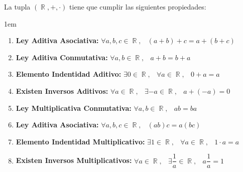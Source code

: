 \documentclass[12pt, fleqn]{report}                             %
\newenvironment{SmallIndentation}[1][0.75em]                    %
        {\begin{adjustwidth}{#1}{}\begin{footnotesize}}             %
        {\end{footnotesize}\end{adjustwidth}}                       %
\DeclareMathOperator \Space     {\quad}                         %
\DeclareMathOperator \MiniSpace {\;}                            %
\theoremstyle{break}                                            %
\DeclareMathOperator \Reals        {\mathbb{R}}                 %
\begin{document}
                La tupla $(\Reals, +, \cdot)$ tiene que cumplir las siguientes
                propiedades:

                \begin{SmallIndentation}[1em]

                    \begin{enumerate}
                    
                        \item 
                            \textbf{Ley Aditiva Asociativa:}
                            $\forall a, b, c \in \Reals, \MiniSpace
                                (a + b) + c = a + (b + c)$

                        \item 
                            \textbf{Ley Aditiva Conmutativa:}
                            $\forall a, b \in \Reals, \MiniSpace
                                    a + b = b + a$

                        \item 
                            \textbf{Elemento Indentidad Aditivo:}
                            $\exists 0 \in \Reals, \MiniSpace
                                \forall a \in \Reals, \MiniSpace 0 + a = a$

                        \item 
                            \textbf{Existen Inversos Aditivos:}
                            $\forall a \in \Reals, \MiniSpace
                                    \exists -a \in \Reals, \MiniSpace
                                        a + (-a) = 0$

                        \item 
                            \textbf{Ley Multiplicativa Conmutativa:}
                            $\forall a, b \in \Reals, \MiniSpace
                                    ab = ba$

                        \item 
                            \textbf{Ley Aditiva Asociativa:}
                            $\forall a, b, c \in \Reals, \MiniSpace
                                (ab)c = a(bc)$

                        \item 
                            \textbf{Elemento Indentidad Multiplicativo:}
                            $\exists 1 \in \Reals, \MiniSpace
                                \forall a \in \Reals, \MiniSpace 1 \cdot a = a$

                        \item 
                            \textbf{Existen Inversos Multiplicativos:}
                            $\forall a \in \Reals, \MiniSpace
                                    \exists \dfrac{1}{a} \in \Reals, \MiniSpace
                                        a \dfrac{1}{a} = 1$


\end{enumerate}
\end{SmallIndentation}
\end{document}
